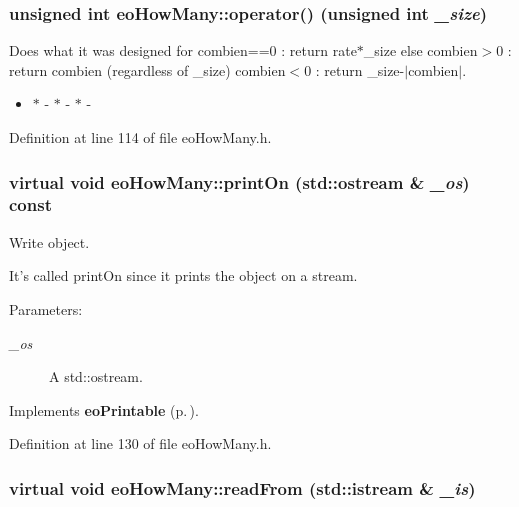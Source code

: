 \subsubsection{\setlength{\rightskip}{0pt plus 5cm}unsigned int eo\-How\-Many::operator() (unsigned int {\em \_\-size})\hspace{0.3cm}{\tt  [inline]}}\label{classeo_how_many_a4}


Does what it was designed for combien==0 : return rate$\ast$\_\-size else combien$>$0 : return combien (regardless of \_\-size) combien$<$0 : return \_\-size-$|$combien$|$. 

\begin{itemize}
\item $\ast$ - $\ast$ - $\ast$ - \end{itemize}


Definition at line 114 of file eo\-How\-Many.h.
\subsubsection{\setlength{\rightskip}{0pt plus 5cm}virtual void eo\-How\-Many::print\-On (std::ostream \& {\em \_\-os}) const\hspace{0.3cm}{\tt  [inline, virtual]}}\label{classeo_how_many_a5}


Write object. 

It's called print\-On since it prints the object on a stream. \begin{Desc}
\item[Parameters:]
\begin{description}
\item[{\em \_\-os}]A std::ostream. \end{description}
\end{Desc}


Implements {\bf eo\-Printable} {\rm (p.\,\pageref{classeo_printable_a1})}.

Definition at line 130 of file eo\-How\-Many.h.
\subsubsection{\setlength{\rightskip}{0pt plus 5cm}virtual void eo\-How\-Many::read\-From (std::istream \& {\em \_\-is})\hspace{0.3cm}{\tt  [inline, virtual]}}\label{classeo_how_many_a6}



